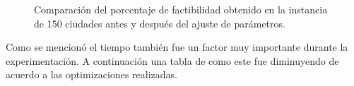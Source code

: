 \documentclass[twoside,11pt]{article}
\begin{document}
\begin{figure}[H]
    \centering

    \begin{minipage}[t]{0.48\linewidth}
        \centering
        \caption*{(a) Configuración inicial: 5\% de soluciones factibles.}
    \end{minipage}
    \hfill
    \begin{minipage}[t]{0.48\linewidth}
        \centering
        \caption*{(b) Configuración ajustada: 95\% de soluciones factibles.}
    \end{minipage}

    \caption{Comparación del porcentaje de factibilidad obtenido en la instancia de 150 ciudades antes y después del ajuste de parámetros.}
    \label{fig:factibilidad-pasteles}
\end{figure}


Como se mencionó el tiempo también fue un factor muy importante durante la  experimentación. A continuación una tabla de como este fue diminuyendo de acuerdo a las optimizaciones realizadas. 
\end{document}
